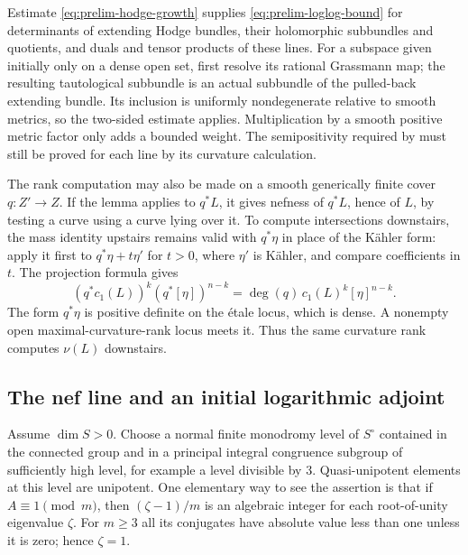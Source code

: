 \begin{remark}\label{rem:prelim-metric-operations}
Estimate \eqref{eq:prelim-hodge-growth} supplies
\eqref{eq:prelim-loglog-bound} for determinants of extending Hodge
bundles, their holomorphic subbundles and quotients, and duals and tensor
products of these lines.  For a subspace given initially only on a dense
open set, first resolve its rational Grassmann map; the resulting
tautological subbundle is an actual subbundle of the pulled-back
extending bundle.  Its inclusion is uniformly nondegenerate relative
to smooth metrics, so the two-sided estimate applies.  Multiplication
by a smooth positive metric factor only adds a bounded weight.  The
semipositivity required by  must still be proved for
each line by its curvature calculation.

The rank computation may also be made on a smooth generically finite
cover $q:Z'\to Z$.  If the lemma applies to $q^*L$, it gives nefness of
$q^*L$, hence of $L$, by testing a curve using a curve lying over it.
To compute intersections downstairs, the mass identity upstairs remains
valid with $q^*\eta$ in place of the Kähler form: apply it first to
$q^*\eta+t\eta'$ for $t>0$, where $\eta'$ is Kähler, and compare
coefficients in $t$.  The projection formula gives
\[
 (q^*c_1(L))^k(q^*[\eta])^{n-k}
       =\deg(q)\,c_1(L)^k[\eta]^{n-k}.
\]
The form $q^*\eta$ is positive definite on the étale locus, which is
dense.  A nonempty open maximal-curvature-rank locus meets it.  Thus the
same curvature rank computes $\nu(L)$ downstairs.
\end{remark}


\subsection{The nef line and an initial logarithmic adjoint}

Assume $\dim S>0$.  Choose a normal finite monodromy level of
$S^\circ$ contained in the connected group and in a principal
integral congruence subgroup of sufficiently high level, for
example a level divisible by $3$.  Quasi-unipotent elements at
this level are unipotent.  One elementary way to see the
assertion is that if $A\equiv1\pmod m$, then
$(\zeta-1)/m$ is an algebraic integer for each root-of-unity
eigenvalue $\zeta$.  For $m\ge3$ all its conjugates have
absolute value less than one unless it is zero; hence
$\zeta=1$.

